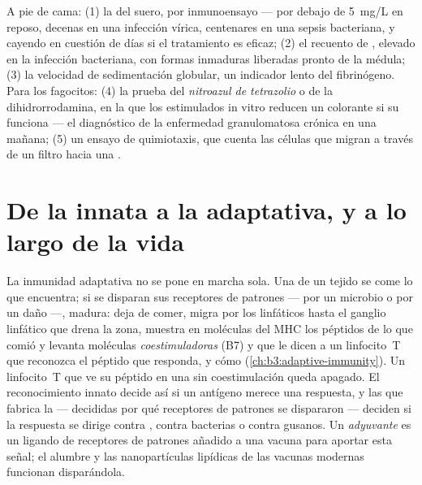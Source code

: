 \begin{method}\label{met:b3:innate-immunity:tests}
A pie de cama: (1) la \emph{} del suero, por
inmunoensayo --- por debajo de \qty{5}{mg/L} en reposo, decenas en una
infección vírica, centenares en una sepsis bacteriana, y cayendo en
cuestión de días si el tratamiento es eficaz; (2) el recuento de
, elevado en la infección bacteriana, con formas inmaduras
liberadas pronto de la médula; (3) la velocidad de sedimentación
globular, un indicador lento del fibrinógeno. Para los fagocitos: (4) la
prueba del \emph{nitroazul de tetrazolio} o de la dihidrorrodamina, en la
que los  estimulados in vitro reducen un colorante si su
 funciona --- el diagnóstico de la enfermedad granulomatosa
crónica en una mañana; (5) un ensayo de quimiotaxis, que cuenta las
células que migran a través de un filtro hacia una .
\end{method}

\section{De la innata a la adaptativa, y a lo largo de la vida}

\begin{proposition}\label{prop:b3:innate-immunity:bridge}
La inmunidad adaptativa no se pone en marcha sola. Una \emph{} de un tejido se come lo que encuentra; si se disparan sus
receptores de patrones --- por un microbio o por un daño ---, madura:
deja de comer, migra por los linfáticos hasta el ganglio linfático que
drena la zona, muestra en moléculas del MHC los péptidos de lo que comió
y levanta moléculas \emph{coestimuladoras} (B7) y  que le dicen
a un linfocito~T que reconozca el péptido que responda, y cómo
(\cref{ch:b3:adaptive-immunity}). Un linfocito~T que ve su péptido en una
 sin coestimulación queda apagado. El reconocimiento
innato decide así si un antígeno merece una respuesta, y las 
que fabrica la  --- decididas por qué receptores de
patrones se dispararon --- deciden si la respuesta se dirige contra
, contra bacterias o contra gusanos. Un \emph{adyuvante} es un
ligando de receptores de patrones añadido a una vacuna para aportar esta
señal; el alumbre y las nanopartículas lipídicas de las vacunas modernas
funcionan disparándola.
\end{proposition}

